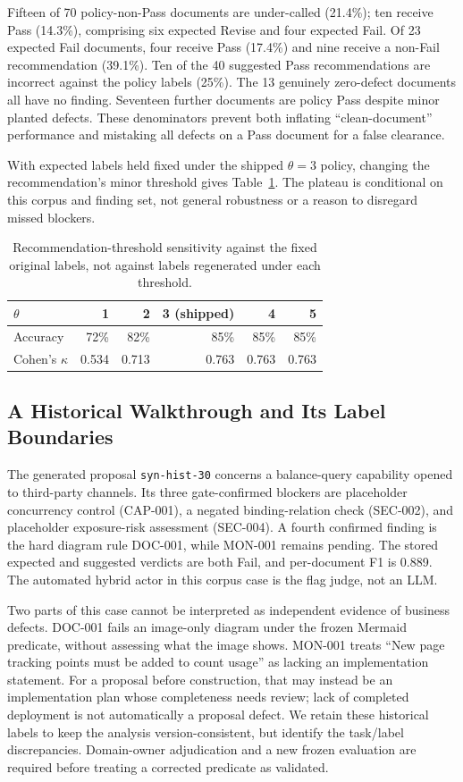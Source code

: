 Fifteen of 70 policy-non-Pass documents are under-called (21.4\%); ten receive Pass (14.3\%), comprising six expected Revise and four expected Fail. Of 23 expected Fail documents, four receive Pass (17.4\%) and nine receive a non-Fail recommendation (39.1\%). Ten of the 40 suggested Pass recommendations are incorrect against the policy labels (25\%). The 13 genuinely zero-defect documents all have no finding. Seventeen further documents are policy Pass despite minor planted defects. These denominators prevent both inflating ``clean-document'' performance and mistaking all defects on a Pass document for a false clearance.

With expected labels held fixed under the shipped $\theta=3$ policy, changing the recommendation's minor threshold gives Table~\ref{tab:theta}. The plateau is conditional on this corpus and finding set, not general robustness or a reason to disregard missed blockers.

\begin{table}[!ht]
\caption{Recommendation-threshold sensitivity against the fixed original labels, not against labels regenerated under each threshold.}
\label{tab:theta}
\centering\footnotesize
\begin{tabular}{@{}lrrrrr@{}}
\toprule
$\theta$ & 1 & 2 & 3 (shipped) & 4 & 5 \\
\midrule
Accuracy & 72\% & 82\% & 85\% & 85\% & 85\% \\
Cohen's $\kappa$ & 0.534 & 0.713 & 0.763 & 0.763 & 0.763 \\
\bottomrule
\end{tabular}
\end{table}

\subsection{A Historical Walkthrough and Its Label Boundaries}

The generated proposal \texttt{syn-hist-30} concerns a balance-query capability opened to third-party channels. Its three gate-confirmed blockers are placeholder concurrency control (CAP-001), a negated binding-relation check (SEC-002), and placeholder exposure-risk assessment (SEC-004). A fourth confirmed finding is the hard diagram rule DOC-001, while MON-001 remains pending. The stored expected and suggested verdicts are both Fail, and per-document F1 is 0.889. The automated hybrid actor in this corpus case is the flag judge, not an LLM.

Two parts of this case cannot be interpreted as independent evidence of business defects. DOC-001 fails an image-only diagram under the frozen Mermaid predicate, without assessing what the image shows. MON-001 treats ``New page tracking points must be added to count usage'' as lacking an implementation statement. For a proposal before construction, that may instead be an implementation plan whose completeness needs review; lack of completed deployment is not automatically a proposal defect. We retain these historical labels to keep the analysis version-consistent, but identify the task/label discrepancies. Domain-owner adjudication and a new frozen evaluation are required before treating a corrected predicate as validated.

